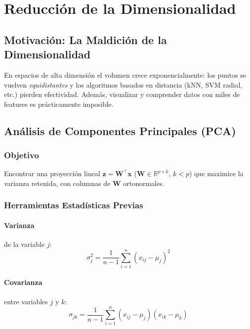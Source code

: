 \documentclass[12pt, a4paper]{article}
\newcommand{\R}{\mathbb{R}}
\begin{document}
\section{Reducción de la Dimensionalidad}

\subsection{Motivación: La Maldición de la Dimensionalidad}

\begin{notebox}
  En espacios de alta dimensión el volumen crece exponencialmente: los puntos se vuelven
  \emph{equidistantes} y los algoritmos basados en distancia (kNN, SVM radial, etc.)
  pierden efectividad. Además, visualizar y comprender datos con miles de features es
  prácticamente imposible.
\end{notebox}

\subsection{Análisis de Componentes Principales (PCA)}

\subsubsection{Objetivo}
Encontrar una proyección lineal $\mathbf{z} = \mathbf{W}^\top \mathbf{x}$
($\mathbf{W} \in \R^{p\times k}$, $k < p$) que maximice la varianza retenida,
con columnas de $\mathbf{W}$ ortonormales.

\subsubsection{Herramientas Estadísticas Previas}

\paragraph{Varianza} de la variable $j$:
\[
  \sigma_j^2 = \frac{1}{n-1}\sum_{i=1}^n (x_{ij} - \mu_j)^2
\]

\paragraph{Covarianza} entre variables $j$ y $k$:
\[
  \sigma_{jk} = \frac{1}{n-1}\sum_{i=1}^n (x_{ij}-\mu_j)(x_{ik}-\mu_k)
\]
\end{document}
